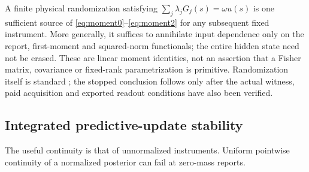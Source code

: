 A finite physical randomization satisfying $\sum_j\lambda_jG_j(s)=\omega u(s)$ is one sufficient source of \eqref{eq:moment0}--\eqref{eq:moment2} for any subsequent fixed instrument. More generally, it suffices to annihilate input dependence only on the report, first-moment and squared-norm functionals; the entire hidden state need not be erased. These are linear moment identities, not an assertion that a Fisher matrix, covariance or fixed-rank parametrization is primitive. Randomization itself is standard \cite{Luschgy,AMTW}; the stopped conclusion follows only after the actual witness, paid acquisition and exported readout conditions have also been verified.

\subsection*{Integrated predictive-update stability}
The useful continuity is that of unnormalized instruments. Uniform pointwise continuity of a normalized posterior can fail at zero-mass reports.

